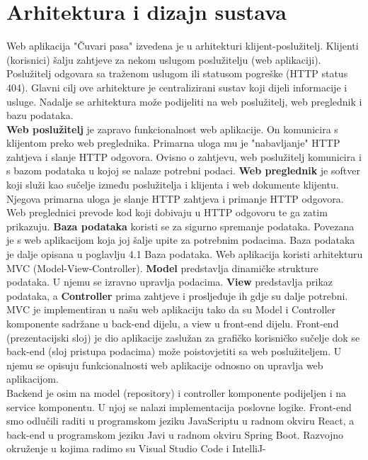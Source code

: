 \chapter{Arhitektura i dizajn sustava}

		Web aplikacija "Čuvari pasa" izvedena je u arhitekturi klijent-poslužitelj. Klijenti (korisnici) šalju zahtjeve za nekom uslugom poslužitelju (web aplikaciji). Poslužitelj odgovara sa traženom uslugom ili statusom pogreške (HTTP status 404). Glavni cilj ove arhitekture je centralizirani sustav koji dijeli informacije i usluge.
		Nadalje se arhitektura može podijeliti na web poslužitelj, web preglednik i bazu podataka.\\
		\newline
		\textbf{Web poslužitelj} je zapravo funkcionalnost web aplikacije. On komunicira s klijentom preko web preglednika. Primarna uloga mu je "nabavljanje" HTTP zahtjeva i slanje HTTP odgovora. Ovisno o zahtjevu, web poslužitelj komunicira i s bazom podataka u kojoj se nalaze potrebni podaci. 
		\newline
		\textbf{Web preglednik} je softver koji služi kao sučelje između poslužitelja i klijenta i web dokumente klijentu. Njegova primarna uloga je slanje HTTP zahtjeva i primanje HTTP odgovora. Web preglednici prevode kod koji dobivaju u HTTP odgovoru te ga zatim prikazuju.
		\newline
		\textbf{Baza podataka} koristi se za sigurno spremanje podataka. Povezana je s web aplikacijom koja joj šalje upite za potrebnim podacima. Baza podataka je dalje opisana u poglavlju 4.1 Baza podataka.
		\newline
		\newline
		Web aplikacija koristi arhitekturu MVC (Model-View-Controller). \textbf{Model} predstavlja dinamičke strukture podataka. U njemu se izravno upravlja podacima.
		\textbf{View} predstavlja prikaz podataka, a \textbf{Controller} prima zahtjeve i prosljeđuje ih gdje su dalje potrebni. MVC je implementiran u našu web aplikaciju tako da su Model i Controller komponente sadržane u back-end dijelu, a view u front-end dijelu. Front-end (prezentacijski sloj) je dio aplikacije zaslužan za grafičko korisničko sučelje dok se back-end (sloj pristupa podacima) može poistovjetiti sa web poslužiteljem. U njemu se opisuju funkcionalnosti web aplikacije odnosno on upravlja web aplikacijom.\\
		Backend je osim na model (repository) i controller komponente podijeljen i na service komponentu. U njoj se nalazi implementacija poslovne logike.
		\newline
		Front-end smo odlučili raditi u programskom jeziku JavaScriptu u radnom okviru React, a back-end u programskom jeziku Javi u radnom okviru Spring Boot. Razvojno okruženje u kojima radimo su Visual Studio Code i IntelliJ-
		
